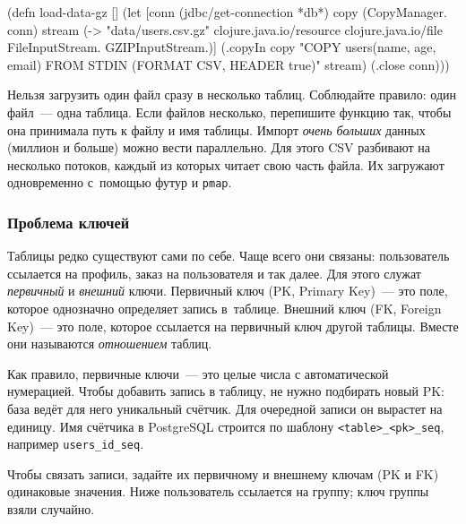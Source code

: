 \begin{english}
  \begin{clojure/lines}
(defn load-data-gz []
  (let [conn (jdbc/get-connection *db*)
        copy (CopyManager. conn)
        stream (-> "data/users.csv.gz"
                   clojure.java.io/resource
                   clojure.java.io/file
                   FileInputStream.
                   GZIPInputStream.)]
    (.copyIn copy "COPY users(name, age, email)
                   FROM STDIN (FORMAT CSV, HEADER true)"
             stream)
    (.close conn)))
  \end{clojure/lines}
\end{english}

\fi

\mnoindent
Нельзя загрузить один файл сразу в несколько таблиц. Соблюдайте правило: один
файл~--- одна таблица. Если файлов несколько, перепишите функцию так, чтобы она
принимала путь к файлу и имя таблицы. Импорт \emph{очень больших} данных
(миллион и больше) можно вести параллельно. Для этого CSV разбивают на несколько
потоков, каждый из которых читает свою часть файла. Их загружают одновременно
с~помощью футур и \verb|pmap|.

\subsubsection*{Проблема ключей}



Таблицы редко существуют сами по себе. Чаще всего они связаны: пользователь
ссылается на профиль, заказ на пользователя и так далее. Для этого служат
\emph{первичный} и \emph{внешний} ключи. Первичный ключ (PK, Primary Key)~--- это
поле, которое однозначно определяет запись в~таблице. Внешний ключ (FK, Foreign
Key)~--- это поле, которое ссылается на первичный ключ другой таблицы. Вместе они
называются \emph{отношением} таблиц.


Как правило, первичные ключи~--- это целые числа с автоматической нумерацией. Чтобы
добавить запись в таблицу, не нужно подбирать новый PK: база ведёт для него
уникальный счётчик. Для очередной записи он вырастет на единицу. Имя счётчика в
PostgreSQL строится по шаблону \verb|<table>_<pk>_seq|, например
\verb|users_id_seq|.

Чтобы связать записи, задайте их первичному и внешнему ключам (PK и FK)
одинаковые значения. Ниже пользователь ссылается на группу; ключ группы взяли
случайно.

